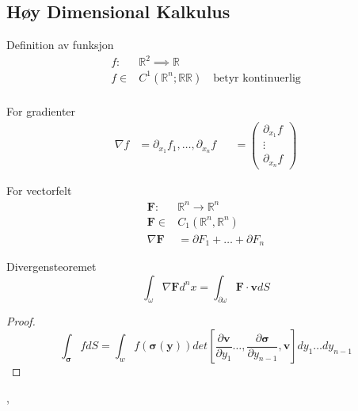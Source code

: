 \documentclass{article}
\newcommand{\incfig}[2][1]{%
\def\svgwidth{#1\columnwidth}
{#2.pdf_tex} } \pdfsuppresswarningpagegroup=1
\theoremstyle{remark}
\begin{document}
\subsection{Høy Dimensional Kalkulus}%
\label{sub:introduction}

Definition av funksjon
\[
\begin{split}
  f: & \mathbb{R} ^{2} \implies \mathbb{R} \\
  f \in & C^{1}\left( \mathbb{R} ^{n}; \mathbb{R} \mathbb{R}  \right) \quad  \text{betyr kontinuerlig}    \\ 
\end{split} 
\]  

For gradienter \[
\begin{split}
\nabla f &=  \partial _{x_{1}} f_{1}, \ldots, \partial _{x_{n}} f & 
&= \begin{pmatrix}
  \partial _{x_{1}} f \\
  \vdots \\
  \partial _{x_{n}} f
\end{pmatrix} 
\end{split} 
\] 

For vectorfelt \[
  \begin{split}
    \mathbf{F}:  & \mathbb{R} ^{n} \to \mathbb{R} ^{n} \\
    \mathbf{F} \in  &  C_{1} \left( \mathbb{R} ^{n} , \mathbb{R} ^{n} \right) \\
    \nabla \mathbf{F} &= \partial F_{1} + \ldots + \partial  F_{n}
  \end{split} 
\] 

\begin{definition}
  Divergensteoremet \[
  \int_{\omega }^{}   \nabla  \mathbf{F} d^{n} x = \int_{\partial \omega }^{}  \mathbf{F} \cdot \mathbf{v} dS 
  \] 
\end{definition}



\begin{proof}
  \[
  \int_{\mathbf{\sigma}}^{}  f dS = \int_{w}^{} f\left( \mathbf{\sigma}\left( \mathbf{y} \right) \right) det \left[ \frac{\partial \mathbf{v}}{\partial y_{1}}   \ldots , \frac{\partial \mathbf{\sigma}}{\partial y_{n-1}} , \mathbf{v} \right] dy_{1} \ldots dy_{n-1}
  \] 
\end{proof}, 
\end{document}
